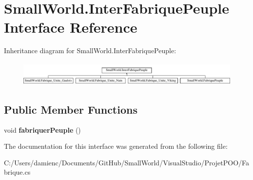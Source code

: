 \hypertarget{interface_small_world_1_1_inter_fabrique_peuple}{\section{Small\-World.\-Inter\-Fabrique\-Peuple Interface Reference}
\label{interface_small_world_1_1_inter_fabrique_peuple}
}
Inheritance diagram for Small\-World.\-Inter\-Fabrique\-Peuple\-:\begin{figure}[H]
\begin{center}
\leavevmode
\includegraphics[height=1.266968cm]{interface_small_world_1_1_inter_fabrique_peuple}
\end{center}
\end{figure}
\subsection*{Public Member Functions}
\begin{DoxyCompactItemize}
\item 
\hypertarget{interface_small_world_1_1_inter_fabrique_peuple_a43c849b7b035e7ebf2e96128c75cd0ee}{void {\bfseries fabriquer\-Peuple} ()}\label{interface_small_world_1_1_inter_fabrique_peuple_a43c849b7b035e7ebf2e96128c75cd0ee}

\end{DoxyCompactItemize}


The documentation for this interface was generated from the following file\-:\begin{DoxyCompactItemize}
\item 
C\-:/\-Users/damienc/\-Documents/\-Git\-Hub/\-Small\-World/\-Visual\-Studio/\-Projet\-P\-O\-O/Fabrique.\-cs\end{DoxyCompactItemize}
